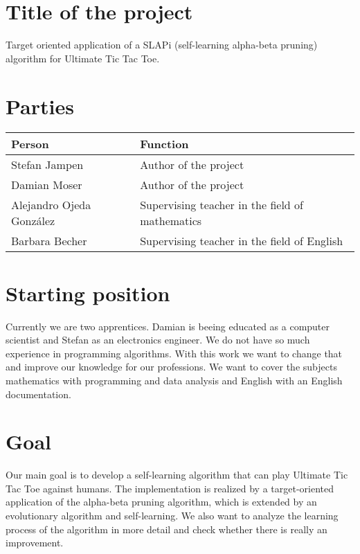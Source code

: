 \section{Title of the project}
Target oriented application of a SLAPi (self-learning alpha-beta pruning) algorithm for Ultimate Tic Tac Toe.

\section{Parties}
\begin{tabularx}{\textwidth}{l|X}
\textbf{Person} & \textbf{Function} \\\hline
Stefan Jampen & Author of the project \\
Damian Moser & Author of the project \\
Alejandro Ojeda González & Supervising teacher in the field of mathematics \\
Barbara Becher & Supervising teacher in the field of English \\
\end{tabularx}

\section{Starting position}
Currently we are two apprentices. Damian is beeing educated as a computer scientist and Stefan as an electronics engineer. We do not have so much experience in programming algorithms. With this work we want to change that and improve our knowledge for our professions. We want to cover the subjects mathematics with programming and data analysis and English with an English documentation.


\section{Goal}
Our main goal is to develop a self-learning algorithm that can play Ultimate Tic Tac Toe against humans. The implementation is realized by a target-oriented application of the alpha-beta pruning algorithm, which is extended by an evolutionary algorithm and self-learning. We also want to analyze the learning process of the algorithm in more detail and check whether there is really an improvement.

